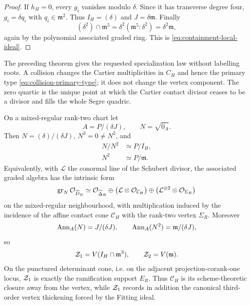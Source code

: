 \begin{proof}
If \(h_H=0\), every \(g_i\) vanishes modulo \(\delta\).  Since it has
transverse degree four, \(g_i=\delta q_i\) with
\(q_i\in\mathfrak m^2\).  Thus \(I_H=(\delta)\) and
\(J=\delta\mathfrak m\).  Finally
\[
 (\delta^2)\cap\mathfrak m^5
 =\delta^2(\mathfrak m^5:\delta^2)
 =\delta^2\mathfrak m,
\]
again by the polynomial associated graded ring.  This is
\eqref{eq:containment-local-ideal}.
\end{proof}

The preceding theorem gives the requested specialization law without
labelling roots.  A collision changes the Cartier multiplicities in
\(C_H\) and hence the primary type
\eqref{eq:collision-primary-type}; it does not change the vertex
component.  The zero quartic is the unique point at which the Cartier
contact divisor ceases to be a divisor and fills the whole Segre
quadric.

\begin{theorem}\label{thm:graded-nilpotent}
On a mixed-regular rank-two chart let
\[
 A=P/(\delta J),\qquad N=\sqrt{0_A}.
\]
Then \(N=(\delta)/(\delta J)\), \(N^3=0\ne N^2\), and
\begin{align}
 N/N^2&\simeq P/I_H, \label{eq:grade-one-contact}\\
 N^2&\simeq P/\mathfrak m. \label{eq:grade-two-vertex}
\end{align}
Equivalently, with \(\mathcal L\) the conormal line of the Schubert
divisor, the associated graded algebra has the intrinsic form
\begin{equation}\label{eq:global-associated-graded}
 \operatorname{gr}_N\mathcal O_{\widehat D_R}
 \simeq
 \mathcal O_{\widehat\Delta_R}
 \oplus
 \bigl(\mathcal L\otimes\mathcal O_{\mathcal C_H}\bigr)
 \oplus
 \bigl(\mathcal L^{\otimes2}\otimes\mathcal O_{\Sigma_R}\bigr)
\end{equation}
on the mixed-regular neighbourhood, with multiplication induced by
the incidence of the affine contact cone \(\mathcal C_H\) with the
rank-two vertex \(\Sigma_R\).
Moreover
\begin{equation}\label{eq:Z1Z2-exact}
 \operatorname{Ann}_A(N)=J/(\delta J),\qquad
 \operatorname{Ann}_A(N^2)=\mathfrak m/(\delta J),
\end{equation}
so
\[
 \mathcal Z_1=V(I_H\cap\mathfrak m^3),\qquad
 \mathcal Z_2=V(\mathfrak m).
\]
On the punctured determinant cone, i.e. on the adjacent
projection-corank-one locus, \(\mathcal Z_1\) is exactly the ramification
support \(E_R\).  Thus \(\mathcal C_H\) is its scheme-theoretic closure away
from the vertex, while \(\mathcal Z_1\) records in addition the canonical
third-order vertex thickening forced by the Fitting ideal.
\end{theorem}

